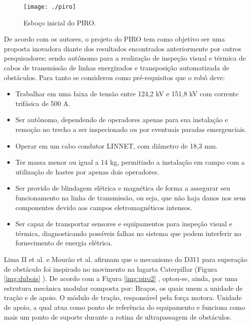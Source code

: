 \begin{figure} [h!]	
	\caption{Esboço inicial do PIRO.}
	\label{img:piro}											 
	\centering													 
	\texttt{[image: ./piro]}
\end{figure}													 

De acordo com os autores, o projeto do PIRO tem como objetivo ser uma proposta inovadora diante dos resultados encontrados anteriormente por outros pesquisadores; sendo autônomo para a realização de inspeção visual e térmica de cabos de transmissão de linhas energizados e transposição automatizada de obstáculos. Para tanto se considerou como pré-requisitos que o robô deve:

\begin{itemize}
	\item Trabalhar em uma faixa de tensão entre 124,2 kV e 151,8 kV com corrente trifásica de 500 A.
	\item Ser autônomo, dependendo de operadores apenas para sua instalação e remoção no trecho a ser inspecionado ou por eventuais paradas emergenciais.
	\item Operar em um cabo condutor LINNET, com diâmetro de 18,3 mm.
	\item Ter massa menor ou igual a 14 kg, permitindo a instalação em campo com a utilização de hastes por apenas dois operadores. 
	\item Ser provido de blindagem elétrica e magnética de forma a assegurar seu funcionamento na linha de transmissão, ou seja, que não haja danos nos seus componentes devido aos campos eletromagnéticos intensos.
	\item Ser capaz de transportar sensores e equipamentos para inspeção visual e térmica, diagnosticando possíveis falhas no sistema que podem interferir no fornecimento de energia elétrica.
\end{itemize}

Lima II et al. \cite{iirobo} e Mourão et al. \cite{mourao2015robolinhas} afirmam que o mecanismo do D311 para superação de obstáculo foi inspirado no movimento na lagarta Caterpillar (Figura \ref{img:dubois} ). De acordo com a Figura \ref{img:piro2} , optou-se, ainda, por uma estrutura mecânica modular composta por: Braços, os quais unem a unidade de tração e de apoio. O módulo de tração, responsável pela força motora. Unidade de apoio, a qual atua como ponto de referência do equipamento e funciona como mais um ponto de suporte durante a rotina de ultrapassagem de obstáculos. 

